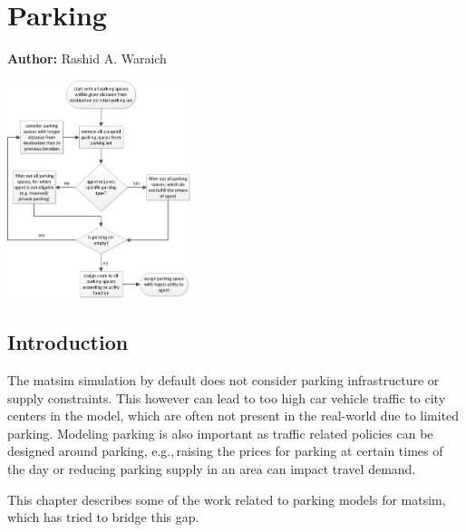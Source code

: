\chapter{Parking}
\label{ch:parking}

\hfill \textbf{Author:} Rashid A. Waraich

\begin{center} \includegraphics[width=0.4\textwidth, angle=0]{extending/figures/Parking/parking_algo.png} \end{center}


\section{Introduction} 
The \gls{matsim} simulation by default does not consider parking infrastructure or supply constraints. This however can lead to too high car vehicle traffic to city centers in the model, which are often not present in the real-world due to limited parking. Modeling parking is also important as traffic related policies can be designed around parking, e.g.,\,raising the prices for parking at certain times of the day or reducing parking supply in an area can impact travel demand. 

This chapter describes some of the work related to parking models for \gls{matsim}, which has tried to bridge this gap.

